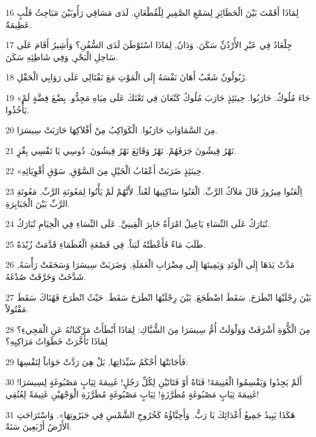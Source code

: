 \par 16 لِمَاذَا أَقَمْتَ بَيْنَ الْحَظَائِرِ لِسَمْعِ الصَّفِيرِ لِلْقُطْعَانِ. لَدَى مَسَاقِي رَأُوبَيْنَ مَبَاحِثُ قَلْبٍ عَظِيمَةٌ.
\par 17 جِلْعَادُ فِي عَبْرِ الأُرْدُنِّ سَكَنَ. وَدَانُ, لِمَاذَا اسْتَوْطَنَ لَدَى السُّفُنِ؟ وَأَشِيرُ أَقَامَ عَلَى سَاحِلِ الْبَحْرِ, وَفِي شَاطِئِهِ سَكَنَ.
\par 18 زَبُولُونُ شَعْبٌ أَهَانَ نَفْسَهُ إِلَى الْمَوْتِ مَعَ نَفْتَالِي عَلَى رَوَابِي الْحَقْلِ.
\par 19 «جَاءَ مُلُوكٌ. حَارَبُوا. حِينَئِذٍ حَارَبَ مُلُوكُ كَنْعَانَ فِي تَعْنَكَ عَلَى مِيَاهِ مَجِدُّو. بِضْعَ فِضَّةٍ لَمْ يَأْخُذُوا.
\par 20 مِنَ السَّمَاوَاتِ حَارَبُوا. الْكَوَاكِبُ مِنْ أَفْلاَكِهَا حَارَبَتْ سِيسَرَا.
\par 21 نَهْرُ قِيشُونَ جَرَفَهُمْ. نَهْرُ وَقَائِعَ نَهْرُ قِيشُونَ. دُوسِي يَا نَفْسِي بِعِّزٍ.
\par 22 «حِينَئِذٍ ضَرَبَتْ أَعْقَابُ الْخَيْلِ مِنَ السَّوْقِ, سَوْقِ أَقْوِيَائِهِ.
\par 23 اِلْعَنُوا مِيرُوزَ قَالَ مَلاَكُ الرَّبِّ. الْعَنُوا سَاكِنِيهَا لَعْناً, لأَنَّهُمْ لَمْ يَأْتُوا لِمَعُونَةِ الرَّبِّ, مَعُونَةِ الرَّبِّ بَيْنَ الْجَبَابِرَةِ.
\par 24 تُبَارَكُ عَلَى النِّسَاءِ يَاعِيلُ امْرَأَةُ حَابِرَ الْقِينِيِّ. عَلَى النِّسَاءِ فِي الْخِيَامِ تُبَارَكُ.
\par 25 طَلَبَ مَاءً فَأَعْطَتْهُ لَبَناً. فِي قَصْعَةِ الْعُظَمَاءِ قَدَّمَتْ زُبْدَةً.
\par 26 مَدَّتْ يَدَهَا إِلَى الْوَتَدِ وَيَمِينَهَا إِلَى مِضْرَابِ الْعَمَلَةِ, وَضَرَبَتْ سِيسَرَا وَسَحَقَتْ رَأْسَهُ, شَدَّخَتْ وَخَرَّقَتْ صُدْغَهُ.
\par 27 بَيْنَ رِجْلَيْهَا انْطَرَحَ, سَقَطَ اضْطَجَعَ. بَيْنَ رِجْلَيْهَا انْطَرَحَ سَقَطَ. حَيْثُ انْطَرَحَ فَهُنَاكَ سَقَطَ مَقْتُولاً.
\par 28 مِنَ الْكُّوَةِ أَشْرَفَتْ وَوَلْوَلَتْ أُمُّ سِيسَرَا مِنَ الشُّبَّاكِ: لِمَاذَا أَبْطَأَتْ مَرْكَبَاتُهُ عَنِ الْمَجِيءِ؟ لِمَاذَا تَأَخَّرَتْ خَطَوَاتُ مَرَاكِبِهِ؟
\par 29 فَأَجَابَتْهَا أَحْكَمُ سَيِّدَاتِهَا, بَلْ هِيَ رَدَّتْ جَوَاباً لِنَفْسِهَا:
\par 30 أَلَمْ يَجِدُوا وَيَقْسِمُوا الْغَنِيمَةَ! فَتَاةً أَوْ فَتَاتَيْنِ لِكُلِّ رَجُلٍ! غَنِيمَةَ ثِيَابٍ مَصْبُوغَةٍ لِسِيسَرَا! غَنِيمَةَ ثِيَابٍ مَصْبُوغَةٍ مُطَرَّزَةٍ! ثِيَابٍ مَصْبُوغَةٍ مُطَرَّزَةِ الْوَجْهَيْنِ غَنِيمَةً لِعُنُقِي!
\par 31 هَكَذَا يَبِيدُ جَمِيعُ أَعْدَائِكَ يَا رَبُّ. وَأَحِبَّاؤُهُ كَخُرُوجِ الشَّمْسِ فِي جَبَرُوتِهَا». وَاسْتَرَاحَتِ الأَرْضُ أَرْبَعِينَ سَنَةً.

